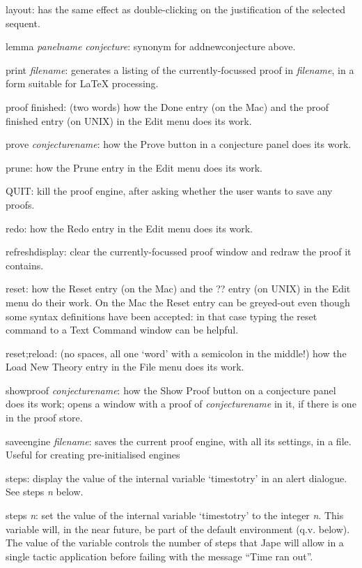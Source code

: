 layout: has the same effect as double-clicking on the justification of the selected sequent.

lemma \textit{panelname} \textit{conjecture}: synonym for addnewconjecture above.


print \textit{filename}: generates a listing of the currently-focussed proof in \textit{filename}, in a form suitable for LaTeX processing.

proof finished: (two words) how the Done entry (on the Mac) and the proof finished entry (on UNIX) in the Edit menu does its work.


prove \textit{conjecturename}: how the Prove button in a conjecture panel does its work.

prune: how the Prune entry in the Edit menu does its work.

QUIT: kill the proof engine, after asking whether the user wants to save any proofs.

redo: how the Redo entry in the Edit menu does its work.

refreshdisplay: clear the currently-focussed proof window and redraw the proof it contains.


reset: how the Reset entry (on the Mac) and the ?? entry (on UNIX) in the Edit menu do their work. On the Mac the Reset entry can be greyed-out even though some syntax definitions have been accepted: in that case typing the reset command to a Text Command window can be helpful.


reset;reload: (no spaces, all one `word' with a semicolon in the middle!) how the Load New Theory entry in the File menu does its work.

showproof \textit{conjecturename}: how the Show Proof button on a conjecture panel does its work; opens a window with a proof of \textit{conjecturename} in it, if there is one in the proof store.

saveengine \textit{filename}: saves the current proof engine, with all its settings, in a file. Useful for creating pre-initialised engines

steps: display the value of the internal variable `timestotry' in an alert dialogue. See steps \textit{n} below.


steps \textit{n}: set the value of the internal variable `timestotry' to the integer \textit{n}. This variable will, in the near future, be part of the default environment (q.v. below). The value of the variable controls the number of steps that Jape will allow in a single tactic application before failing with the message ``Time ran out''.


